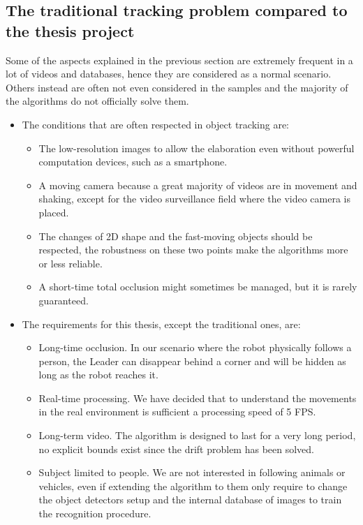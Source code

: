 \subsection{The traditional tracking problem compared to the thesis project} \label{sec:trackingBaseliveVsThesis}
Some of the aspects explained in the previous section are extremely frequent in a lot of videos and databases, hence they are considered as a normal scenario. Others instead are often not even considered in the samples and the majority of the algorithms do not officially solve them.
\begin{itemize}
	\item The conditions that are often respected in object tracking are:
	\begin{itemize}
		\item The low-resolution images to allow the elaboration even without powerful computation devices, such as a smartphone. 
		\item A moving camera because a great majority of videos are in movement and shaking, except for the video surveillance field where the video camera is placed.
		\item The changes of 2D shape and the fast-moving objects should be respected, the robustness on these two points make the algorithms more or less reliable. 
		\item A short-time total occlusion might sometimes be managed, but it is rarely guaranteed.
	\end{itemize}

	\item The requirements for this thesis, except the traditional ones, are:
	\begin{itemize}
		\item Long-time occlusion. In our scenario where the robot physically follows a person, the Leader can disappear behind a corner and will be hidden as long as the robot reaches it.
		\item Real-time processing. We have decided that to understand the movements in the real environment is sufficient a processing speed of 5 FPS.
		\item Long-term video. The algorithm is designed to last for a very long period, no explicit bounds exist since the drift problem has been solved.
		\item Subject limited to people. We are not interested in following animals or vehicles, even if extending the algorithm to them only require to change the object detectors setup and the internal database of images to train the recognition procedure.
	\end{itemize}
	
\end{itemize}



